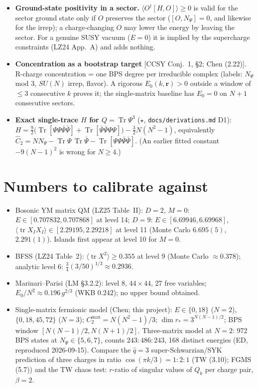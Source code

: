 \documentclass[10pt,a4paper]{article}
\newcommand{\tr}{\operatorname{tr}}
\newcommand{\Tr}{\operatorname{Tr}}
\newcommand{\ev}[1]{\langle #1\rangle}
\newcommand{\Psib}{\bar\Psi}
\newcommand{\refnote}[1]{{\small\textcolor{blue!50!black}{[#1]}}}
\begin{document}
\begin{itemize}
\item \textbf{Ground-state positivity in a sector.} $\ev{O^\dagger[H,O]}\ge0$ is valid for the sector ground state only if $O$ preserves the sector ($[O,N_\Psi]=0$, and likewise for the irrep); a charge-changing $O$ may lower the energy by leaving the sector. For a genuine SUSY vacuum ($E=0$) it is implied by the supercharge constraints (LZ24 App.~A) and adds nothing.
\item \textbf{Concentration as a bootstrap target} \refnote{CCSY Conj.\ 1, \S2; Chen (2.22)}. R-charge concentration = one BPS degree per irreducible complex (labels: $N_\Psi$ mod 3, $SU(N)$ irrep, flavor). A rigorous $E_0(k,\mathbf r)>0$ outside a window of $\le3$ consecutive $k$ proves it; the single-matrix baseline has $E_0=0$ on $N+1$ consecutive sectors.
\item \textbf{Exact single-trace $H$ for $Q=\Tr\Psi^3$} ($\star$, \texttt{docs/derivations.md} D1): $H=\tfrac92\big(\Tr[\Psi\Psi\Psib\Psib]+\Tr[\Psib\Psib\Psi\Psi]\big)-\tfrac32N(N^2-1)$, equivalently $\hat C_2=N N_\Psi-\Tr\Psi\,\Tr\Psib-\Tr[\Psi\Psi\Psib\Psib]$. (An earlier fitted constant $-9(N-1)^2$ is wrong for $N\ge4$.)
\end{itemize}

\section{Numbers to calibrate against}
\begin{itemize}
\item Bosonic YM matrix QM (LZ25 Table~II): $D{=}2$, $M{=}0$: $E\in[0.707832,0.707868]$ at level 14; $D{=}9$: $E\in[6.69946,6.69968]$, $\ev{\tr X_IX_I}\in[2.29195,2.29218]$ at level 11 (Monte Carlo $6.695(5)$, $2.291(1)$). Islands first appear at level 10 for $M=0$.
\item BFSS (LZ24 Table~2): $\ev{\tr X^2}\ge0.355$ at level 9 (Monte Carlo $\approx0.378$); analytic level 6: $\tfrac34(3/50)^{1/3}\approx0.2936$.
\item Marinari--Parisi (LM \S3.2.2): level 8, $44\times44$, 27 free variables; $E_0/N^2\approx0.196\,g^{2/3}$ (WKB $0.242$); no upper bound obtained.
\item Single-matrix fermionic model (Chen; this project): $E\in\{0,18\}$ ($N{=}2$), $\{0,18,45,72\}$ ($N{=}3$); $C_2^{\max}=N(N^2-1)/3$; $\dim r_*=3^{N(N-1)/2}$; BPS window $[N(N-1)/2,N(N+1)/2]$. Three-matrix model at $N=2$: 972 BPS states at $N_\Psi\in\{5,6,7\}$, counts $243{:}486{:}243$, 168 distinct energies (ED, reproduced 2026-09-15). Compare the $\hat q=3$ super-Schwarzian/SYK prediction of three charges in ratio $\cos(\pi k/3)=1{:}2{:}1$ (TW \cite{TW} (3.10); FGMS \cite{FGMS} (5.7)) and the TW chaos test: $r$-ratio of singular values of $Q_k$ per charge pair, $\beta=2$.
\end{itemize}
\end{document}
